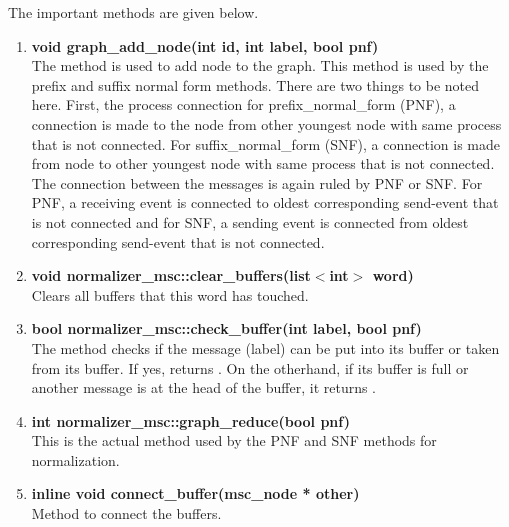 The important methods are given below.
\begin{enumerate}
 \item \textbf{void graph\_add\_node(int id, int label, bool pnf)} \\
	The method is used to add node to the graph. This method is used by the prefix and suffix normal form methods. There are two things to be noted here. First, the process connection for prefix\_normal\_form (PNF), a connection is made to the node from other youngest node with same process that is not connected. For suffix\_normal\_form (SNF), a connection is made from node to other youngest node with same process that is not connected. The connection between the messages is again ruled by PNF or SNF. For PNF, a receiving event is connected to oldest corresponding send-event that is not connected and for SNF, a sending event is connected from oldest corresponding send-event that is not connected.
 \item \textbf{void normalizer\_msc::clear\_buffers(list$<$int$>$ word)} \\
        Clears all buffers that this word has touched.
 \item \textbf{bool normalizer\_msc::check\_buffer(int label, bool pnf)} \\
	The method checks if the message (label) can be put into its buffer or taken from its buffer. If yes, returns \true. On the otherhand, if its buffer is full or another message is at the head of the buffer, it returns \false.
 \item \textbf{int normalizer\_msc::graph\_reduce(bool pnf)} \\
	This is the actual method used by the PNF and SNF methods for normalization.  
 \item \textbf{inline void connect\_buffer(msc\_node * other)} \\
	Method to connect the buffers.
\end{enumerate}
